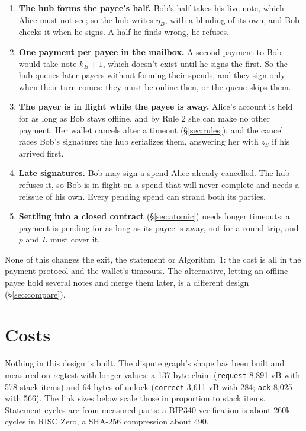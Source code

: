 \documentclass[11pt]{article}
\theoremstyle{plain}
\theoremstyle{definition}
\newcommand{\tx}[1]{\texttt{#1}}
\begin{document}
\begin{enumerate}[nosep]
\item \textbf{The hub forms the payee's half.} Bob's half takes his live
  note, which Alice must not see; so the hub writes $\eta_B$, with a
  blinding of its own, and Bob checks it when he signs. A half he finds
  wrong, he refuses.
\item \textbf{One payment per payee in the mailbox.} A second payment to
  Bob would take note $k_B + 1$, which doesn't exist until he signs the
  first. So the hub queues later payers without forming their spends,
  and they sign only when their turn comes: they must be online then,
  or the queue skips them.
\item \textbf{The payer is in flight while the payee is away.} Alice's
  account is held for as long as Bob stays offline, and by Rule 2 she
  can make no other payment. Her wallet cancels after a timeout
  (\S\ref{sec:rules}), and the cancel races Bob's signature: the hub
  serializes them, answering her with $z_S$ if his arrived first.
\item \textbf{Late signatures.} Bob may sign a spend Alice already
  cancelled. The hub refuses it, so Bob is in flight on a spend that
  will never complete and needs a reissue of his own. Every pending
  spend can strand both its parties.
\item \textbf{Settling into a closed contract} (\S\ref{sec:atomic})
  needs longer timeouts: a payment is pending for as long as its payee
  is away, not for a round trip, and $p$ and $L$ must cover it.
\end{enumerate}

None of this changes the exit, the statement or Algorithm~1: the cost is
all in the payment protocol and the wallet's timeouts. The alternative,
letting an offline payee hold several notes and merge them later, is a
different design (\S\ref{sec:compare}).

\section{Costs}\label{sec:costs}

Nothing in this design is built. The dispute graph's shape has been
built and measured on regtest with longer values: a 137-byte claim
(\tx{request} 8,891 vB with 578 stack items) and 64 bytes of unlock
(\tx{correct} 3,611 vB with 284; \tx{ack} 8,025 with 566). The link
sizes below scale those in proportion to stack items. Statement cycles
are from measured parts: a BIP340 verification is about 260k cycles in
RISC Zero, a SHA-256 compression about 490.
\end{document}
